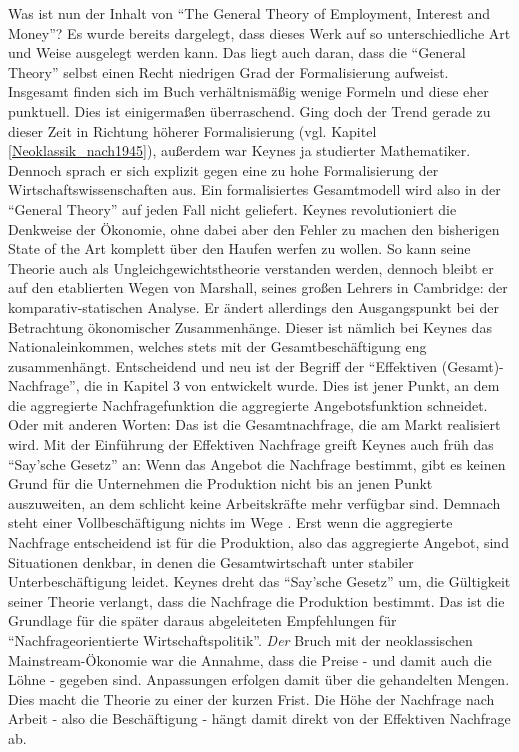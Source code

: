 Was ist nun der Inhalt von "`The General Theory of Employment, Interest and Money"'? Es wurde bereits dargelegt, dass dieses Werk auf so unterschiedliche Art und Weise ausgelegt werden kann. Das liegt auch daran, dass die "`General Theory"' selbst einen Recht niedrigen Grad der Formalisierung aufweist. Insgesamt finden sich im Buch verhältnismäßig wenige Formeln und diese eher punktuell. Dies ist einigermaßen überraschend. Ging doch der Trend gerade zu dieser Zeit in Richtung höherer Formalisierung (vgl. Kapitel \ref{Neoklassik_nach1945}), außerdem war Keynes ja studierter Mathematiker. Dennoch sprach er sich explizit gegen eine zu hohe Formalisierung der Wirtschaftswissenschaften aus. Ein formalisiertes Gesamtmodell wird also in der "`General Theory"' auf jeden Fall nicht geliefert. Keynes revolutioniert die Denkweise der Ökonomie, ohne dabei aber den Fehler zu machen den bisherigen State of the Art komplett über den Haufen werfen zu wollen. So kann seine Theorie auch als Ungleichgewichtstheorie verstanden werden, dennoch bleibt er auf den etablierten Wegen von Marshall, seines großen Lehrers in Cambridge: der komparativ-statischen Analyse. Er ändert allerdings den Ausgangspunkt bei der Betrachtung ökonomischer Zusammenhänge. Dieser ist nämlich bei Keynes das Nationaleinkommen, welches stets mit der Gesamtbeschäftigung eng zusammenhängt. Entscheidend und neu ist der Begriff der "`Effektiven (Gesamt)-Nachfrage"', die in Kapitel 3 von \textcite[S. 25]{Keynes1936} entwickelt wurde. Dies ist jener Punkt, an dem die aggregierte Nachfragefunktion die aggregierte Angebotsfunktion schneidet. Oder mit anderen Worten: Das ist die Gesamtnachfrage, die am Markt realisiert wird. Mit der Einführung der Effektiven Nachfrage greift Keynes auch früh das "`Say'sche Gesetz"' an: Wenn das Angebot die Nachfrage bestimmt, gibt es keinen Grund für die Unternehmen die Produktion nicht bis an jenen Punkt auszuweiten, an dem schlicht keine Arbeitskräfte mehr verfügbar sind. Demnach steht einer Vollbeschäftigung nichts im Wege \parencite[S. 26]{Keynes1936}. Erst wenn die aggregierte Nachfrage entscheidend ist für die Produktion, also das aggregierte Angebot, sind Situationen denkbar, in denen die Gesamtwirtschaft unter stabiler Unterbeschäftigung leidet. Keynes dreht das "`Say'sche Gesetz"' um, die Gültigkeit seiner Theorie verlangt, dass die Nachfrage die Produktion bestimmt. Das ist die Grundlage für die später daraus abgeleiteten Empfehlungen für "`Nachfrageorientierte Wirtschaftspolitik"'. \textit{Der} Bruch mit der neoklassischen Mainstream-Ökonomie war die Annahme, dass die Preise - und damit auch die Löhne - gegeben sind\parencite[S. 58]{Snowdon2005}. Anpassungen erfolgen damit über die gehandelten Mengen. Dies macht die Theorie zu einer der kurzen Frist. Die Höhe der Nachfrage nach Arbeit - also die Beschäftigung - hängt damit direkt von der Effektiven Nachfrage ab.

